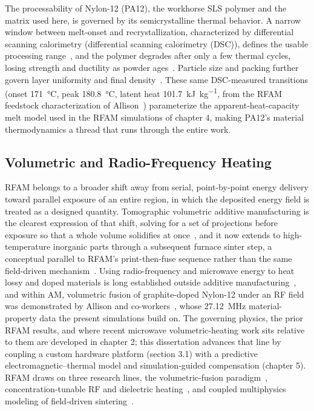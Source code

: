 The processability of Nylon-12 (PA12), the workhorse SLS polymer and the
matrix used here, is governed by its semicrystalline thermal behavior. A narrow
window between melt-onset and recrystallization, characterized by differential
scanning calorimetry (differential scanning calorimetry (DSC)), defines the usable processing
range~\cite{zhao2018crystallization,affolter2001interlaboratory}, and the polymer
degrades after only a few thermal cycles, losing strength and ductility as powder
ages~\cite{verbelen2016characterization,zarringhalam2006effects,pham2008deterioration,choren2001sls,gornet2002characterization}.
Particle size and packing further govern layer uniformity and final
density~\cite{mokrane2018process}. These same DSC-measured transitions
(onset \SI{171}{\celsius}, peak \SI{180.8}{\celsius}, latent heat
\SI{101.7}{\kilo\joule\per\kilogram}, from the RFAM feedstock characterization of
Allison~\cite{allisonDissertation}) parameterize the apparent-heat-capacity melt
model used in the RFAM simulations of chapter 4, making PA12's
material thermodynamics a thread that runs through the entire work.

\subsection{Volumetric and Radio-Frequency Heating}
\label{sec:intro_bg_rf}

RFAM belongs to a broader shift away from serial, point-by-point energy delivery
toward parallel exposure of an entire region, in which the deposited energy field is
treated as a designed quantity. Tomographic volumetric additive manufacturing is the
clearest expression of that shift, solving for a set of projections before exposure so
that a whole volume solidifies at once~\cite{kelly2019volumetric}, and it now extends
to high-temperature inorganic parts through a subsequent furnace sinter step, a
conceptual parallel to RFAM's print-then-fuse sequence rather than the same
field-driven mechanism~\cite{toombs2022silica,madridwolff2023vamreview}.
Using radio-frequency and microwave energy to heat lossy and doped materials is
long established outside additive
manufacturing~\cite{wroe1998rfmicrowave,ferdous2017rfheating}, and within AM,
volumetric fusion of graphite-doped Nylon-12 under an RF field was demonstrated by
Allison and co-workers~\cite{allison2022volumetric,allisonDissertation}, whose
\SI{27.12}{\mega\hertz} material-property data the present simulations build on. The
governing physics, the prior RFAM results, and where recent microwave
volumetric-heating work sits relative to them are developed in chapter 2;
this dissertation advances that line by coupling a custom hardware platform
(section 3.1) with a predictive electromagnetic--thermal model and
simulation-guided compensation (chapter 5). RFAM draws on three research
lines, the volumetric-fusion paradigm~\cite{kelly2019volumetric}, concentration-tunable
RF and dielectric heating~\cite{vashisth2021rfsusceptors}, and coupled multiphysics
modeling of field-driven sintering~\cite{maniere2017coupled}.

